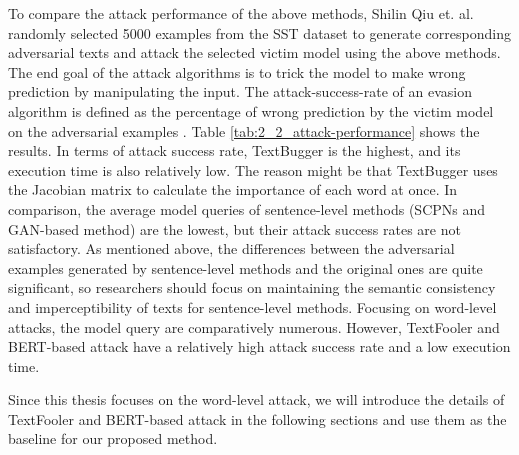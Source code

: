 To compare the attack performance of the above methods, Shilin Qiu et. al. \cite{QIU2022278} randomly selected 5000 examples from the SST dataset to generate corresponding adversarial texts and attack the selected victim model using the above methods. 
The end goal of the attack algorithms is to trick
the model to make wrong prediction by manipulating the input. The \gls{attack-success-rate} of an evasion algorithm is defined as
the percentage of wrong prediction by the victim model on the adversarial examples \cite{conf/acl-wnlp/TsaiYC19}.
Table \ref{tab:2_2_attack-performance} shows the results.
In terms of attack success rate, TextBugger is the highest, and its execution time is also relatively low. The reason might be that TextBugger uses the Jacobian matrix to calculate the importance of each word at once. In comparison, the average model queries of sentence-level methods (SCPNs and GAN-based method) are the lowest, but their attack success rates are not satisfactory. As mentioned above, the differences between the adversarial examples generated by sentence-level methods and the original ones are quite significant, so researchers should focus on maintaining the semantic consistency and imperceptibility of texts for sentence-level methods.
Focusing on word-level attacks, the model query are comparatively numerous. However, TextFooler and BERT-based attack have a relatively high attack success rate and a low execution time. 

Since this thesis focuses on the word-level attack, we will introduce the details of TextFooler and BERT-based attack in the following sections and use them as the baseline for our proposed method.

